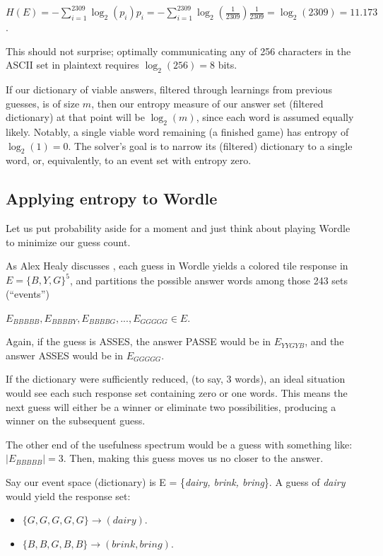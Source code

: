 \documentclass[11pt, oneside]{article} 	%
\begin{document}
$H(E) = -\sum_{i=1}^{2309} \log_2(p_i)p_i = -\sum_{i=1}^{2309} \log_2(\frac{1}{2309}) \frac{1}{2309} = \log_2(2309) = 11.173$. 

This should not surprise; optimally communicating any of 256 characters in the ASCII set in plaintext requires $\log_2(256) = 8$ bits.

If our dictionary of viable answers, filtered through learnings from previous guesses, is of size $m$, then our entropy measure of our answer set (filtered dictionary) at that point will be $\log_2(m)$, since each word is assumed equally likely. Notably, a single viable word remaining (a finished game) has entropy of $\log_2(1) = 0$. The solver's goal is to narrow its (filtered) dictionary to a single word, or, equivalently, to an event set with entropy zero.
 
\subsection{Applying entropy to Wordle}

Let us put probability aside for a moment and just think about playing Wordle to minimize our guess count.

As Alex Healy discusses \cite{1}, each guess in Wordle yields a colored tile response in $E = \{B, Y, G\}^5$, and partitions the possible answer words among those 243 sets (``events'')

\begin{center}
$E_{BBBBB}, E_{BBBBY}, E_{BBBBG}, ... , E_{GGGGG} \in E$. 
\end{center}

Again, if the guess is ASSES, the answer PASSE would be in $E_{YYGYB}$, and the answer ASSES would be in $E_{GGGGG}$.

If the dictionary were sufficiently reduced, (to say, 3 words), an ideal situation would see each such response set containing zero or one words. This means the next guess will either be a winner or eliminate two possibilities, producing a winner on the subsequent guess. 

The other end of the usefulness spectrum would be a guess with something like:
$|E_{BBBBB}| = 3$. Then, making this guess moves us no closer to the answer. 

Say our event space (dictionary) is E = \{\emph{dairy, brink, bring}\}. A guess of \emph{dairy} would yield the response set:

\begin{itemize}
\item $\{G, G, G, G, G\} \rightarrow (dairy)$.
\item $\{B, B, G, B, B\} \rightarrow (brink, bring)$.
\end{itemize}
\end{document}

